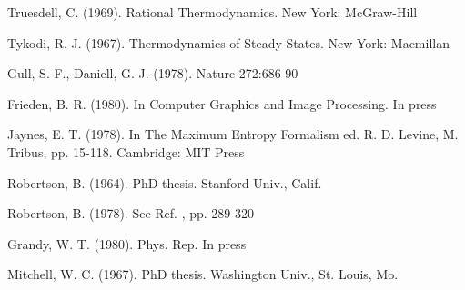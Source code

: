 \documentclass{article}
\begin{document}
\begin{thebibliography}{99}
 Truesdell, C. (1969). Rational Thermodynamics. New York: McGraw-Hill

 Tykodi, R. J. (1967). Thermodynamics of Steady States. New York: Macmillan

 Gull, S. F., Daniell, G. J. (1978). Nature 272:686-90

 Frieden, B. R. (1980). In Computer Graphics and Image Processing. In press

 Jaynes, E. T. (1978). In The Maximum Entropy Formalism ed. R. D. Levine, M. Tribus, pp. 15-118. Cambridge: MIT Press

 Robertson, B. (1964). PhD thesis. Stanford Univ., Calif.

 Robertson, B. (1978). See Ref. \cite{jaynes1978}, pp. 289-320

 Grandy, W. T. (1980). Phys. Rep. In press

 Mitchell, W. C. (1967). PhD thesis. Washington Univ., St. Louis, Mo.

\end{thebibliography}
\end{document}
